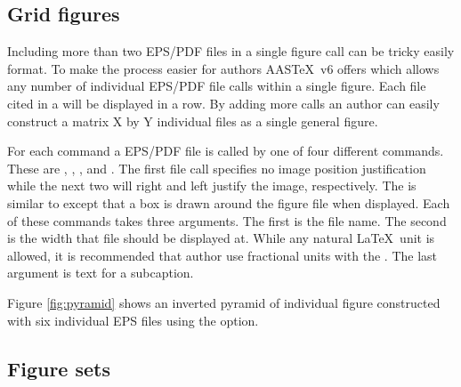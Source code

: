 \documentclass[preprint]{aastex62}
\newcommand\aastex{AAS\TeX}
\newcommand\latex{La\TeX}
\begin{document}
\subsection{Grid figures}

Including more than two EPS/PDF files in a single figure call can be tricky
easily format.  To make the process easier for authors \aastex\ v6 offers
{\tt\string\gridline} which allows any number of individual EPS/PDF file
calls within a single figure.  Each file cited in a {\tt\string\gridline}
will be displayed in a row.  By adding more {\tt\string\gridline} calls an
author can easily construct a matrix X by Y individual files as a
single general figure.

For each {\tt\string\gridline} command a EPS/PDF file is called by one of
four different commands.  These are {\tt\string\fig},
{\tt\string\rightfig}, {\tt\string\leftfig}, and {\tt\string\boxedfig}.
The first file call specifies no image position justification while the
next two will right and left justify the image, respectively.  The
{\tt\string\boxedfig} is similar to {\tt\string\fig} except that a box is
drawn around the figure file when displayed. Each of these commands takes
three arguments.  The first is the file name.  The second is the width that
file should be displayed at.  While any natural \latex\ unit is allowed, it
is recommended that author use fractional units with the
{\tt\string\textwidth}.  The last argument is text for a subcaption.

Figure \ref{fig:pyramid} shows an inverted pyramid of individual
figure constructed with six individual EPS files using the
{\tt\string\gridline} option.

\begin{figure*}
\caption{Inverted pyramid figure of six individual files. The nova are
(a) V2491 Cyg, (b) HV Cet, (c) LMC 2009, (d) RS Oph, (e) U Sco, and
(f) KT Eri.\label{fig:pyramid}}
\end{figure*}

\subsection{Figure sets}
\end{document}
